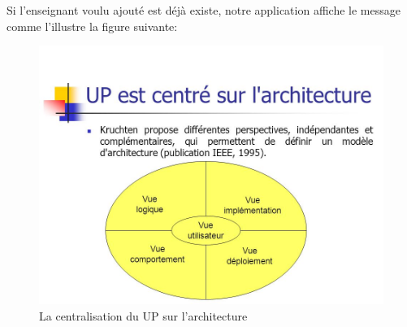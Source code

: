 \documentclass[12 pt ]{report}
\begin{document}
Si l'enseignant voulu ajouté est déjà existe, notre application affiche le message comme l'illustre la figure suivante:
\begin{figure}[h]
\begin{center}
\includegraphics[scale=0.5]{u.jpg}
\caption{ La centralisation du UP sur l'architecture}
\end{center}
\end{figure}
\end{document}
